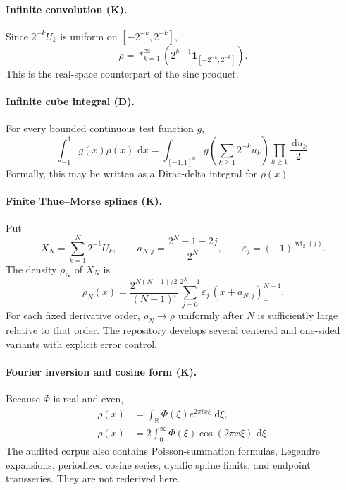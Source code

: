 \documentclass[11pt]{article}
\theoremstyle{definition}
\theoremstyle{remark}
\newcommand{\R}{\mathbb R}
\newcommand{\N}{\mathbb N}
\newcommand{\dd}{\,\mathrm d}
\newcommand{\wt}{\operatorname{wt}_2}
\newcommand{\eps}{\varepsilon}
\newcommand{\one}{\mathbf 1}
\newcommand{\statusknown}{\textsf{K}}
\newcommand{\statusderived}{\textsf{D}}
\begin{document}
\paragraph{Infinite convolution (\statusknown).}
Since \(2^{-k}U_k\) is uniform on \([-2^{-k},2^{-k}]\),
\begin{equation}
 \rho=\mathop{\ast}_{k=1}^{\infty}
 \left(2^{k-1}\one_{[-2^{-k},2^{-k}]}\right).                \label{p1:eq:rho-convolution}
\end{equation}
This is the real-space counterpart of the sinc product.

\paragraph{Infinite cube integral (\statusderived).}
For every bounded continuous test function \(g\),
\begin{equation}
 \int_{-1}^{1}g(x)\rho(x)\,\dd x
 =\int_{[-1,1]^{\N}}g\!\left(\sum_{k\ge1}2^{-k}u_k\right)
   \prod_{k\ge1}\frac{\dd u_k}{2}.                           \label{p1:eq:cube-pushforward}
\end{equation}
Formally, this may be written as a Dirac-delta integral for \(\rho(x)\).

\paragraph{Finite Thue--Morse splines (\statusknown).}
Put
\begin{equation}
 X_N=\sum_{k=1}^{N}2^{-k}U_k,
 \qquad
 a_{N,j}=\frac{2^N-1-2j}{2^N},
 \qquad
 \eps_j=(-1)^{\wt(j)}.                                      \label{p1:eq:aNj}
\end{equation}
The density \(\rho_N\) of \(X_N\) is
\begin{equation}
 \rho_N(x)=\frac{2^{N(N-1)/2}}{(N-1)!}
 \sum_{j=0}^{2^N-1}\eps_j\,(x+a_{N,j})_+^{N-1}.             \label{p1:eq:finite-spline}
\end{equation}
For each fixed derivative order, \(\rho_N\to\rho\) uniformly after \(N\) is sufficiently
large relative to that order.  The repository develops several centered and one-sided
variants with explicit error control.

\paragraph{Fourier inversion and cosine form (\statusknown).}
Because \(\Phi\) is real and even,
\begin{align}
 \rho(x)&=\int_{\R}\Phi(\xi)e^{2\pi i x\xi}\,\dd\xi,
                                                                  \label{p1:eq:rho-fourier-inversion}\\
 \rho(x)&=2\int_0^{\infty}\Phi(\xi)\cos(2\pi x\xi)\,\dd\xi.
                                                                  \label{p1:eq:rho-cosine}
\end{align}
The audited corpus also contains Poisson-summation formulas, Legendre expansions,
periodized cosine series, dyadic spline limits, and endpoint transseries.  They are not
rederived here.
\end{document}
